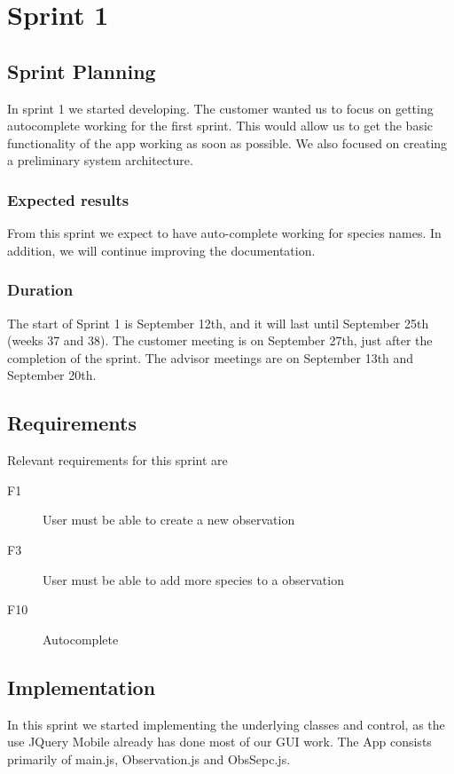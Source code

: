 \section{Sprint 1}

\subsection{Sprint Planning}

	In sprint 1 we started developing. The customer wanted us to focus on getting autocomplete working for the first sprint. This would allow us to get the basic functionality of the app working as soon as possible. We also focused on creating a preliminary system architecture.

\subsubsection{Expected results}
 From this sprint we expect to have auto-complete working for species names. In addition, we will continue improving the documentation.
	
\subsubsection{Duration}
The start of Sprint 1 is September 12th, and it will last until September 25th (weeks 37 and 38). The customer meeting is on September 27th, just after the completion of the sprint. The advisor meetings are on September 13th and September 20th.
	
\subsection{Requirements}

Relevant requirements for this sprint are 
\begin{description}
	\item[F1] User must be able to create a new observation 
	\item[F3] User must be able to add more species to a observation
	\item[F10] Autocomplete 
\end{description}

\subsection{Implementation}
In this sprint we started implementing the underlying classes and control, as the use JQuery Mobile already has done most of our GUI work. The App consists primarily of main.js, Observation.js and ObsSepc.js.

